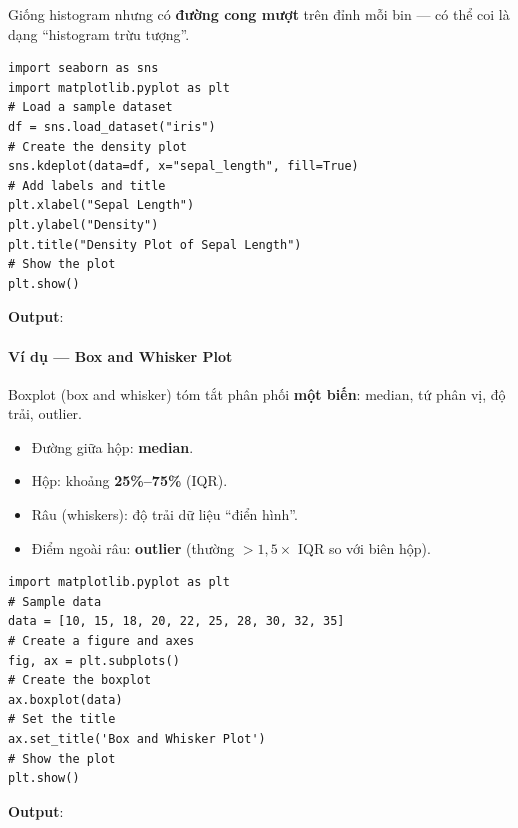 \begin{ynghia}[title={Density plot}]
Giống histogram nhưng có \textbf{đường cong mượt} trên đỉnh mỗi bin --- có thể coi là dạng ``histogram trừu tượng''.
\end{ynghia}

\begin{vidu}[title={Code density plot (Seaborn, Iris)}]
\begin{lstlisting}
import seaborn as sns
import matplotlib.pyplot as plt
# Load a sample dataset
df = sns.load_dataset("iris")
# Create the density plot
sns.kdeplot(data=df, x="sepal_length", fill=True)
# Add labels and title
plt.xlabel("Sepal Length")
plt.ylabel("Density")
plt.title("Density Plot of Sepal Length")
# Show the plot
plt.show()
\end{lstlisting}
\textbf{Output}:
\end{vidu}

\paragraph{Ví dụ --- Box and Whisker Plot}

\begin{ynghia}[title={Boxplot}]
Boxplot (box and whisker) tóm tắt phân phối \textbf{một biến}: median, tứ phân vị, độ trải, outlier.
\end{ynghia}

\begin{tinhchat}[title={Thành phần boxplot}]
\begin{itemize}
  \item Đường giữa hộp: \textbf{median}.
  \item Hộp: khoảng \textbf{25\%--75\%} (IQR).
  \item Râu (whiskers): độ trải dữ liệu ``điển hình''.
  \item Điểm ngoài râu: \textbf{outlier} (thường $> 1{,}5 \times$ IQR so với biên hộp).
\end{itemize}
\end{tinhchat}

\begin{vidu}[title={Code boxplot đơn giản}]
\begin{lstlisting}
import matplotlib.pyplot as plt
# Sample data
data = [10, 15, 18, 20, 22, 25, 28, 30, 32, 35]
# Create a figure and axes
fig, ax = plt.subplots()
# Create the boxplot
ax.boxplot(data)
# Set the title
ax.set_title('Box and Whisker Plot')
# Show the plot
plt.show()
\end{lstlisting}
\textbf{Output}:
\end{vidu}


